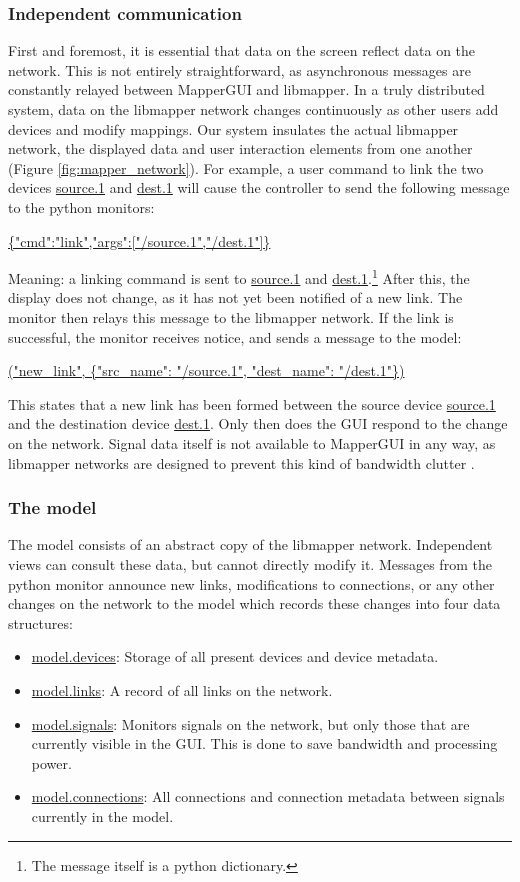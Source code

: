 		\subsubsection{Independent communication}

First and foremost, it is essential that data on the screen reflect data on the network. This is not entirely straightforward, as asynchronous messages are constantly relayed between MapperGUI and libmapper. In a truly distributed system, data on the libmapper network changes continuously as other users add devices and modify mappings. Our system insulates the actual libmapper network, the displayed data and user interaction elements from one another (Figure \ref{fig:mapper_network}). For example, a user command to link the two devices \url{source.1} and \url{dest.1} will cause the controller to send the following message to the python monitors:

\url{ {"cmd":"link","args":["/source.1","/dest.1"]} }

Meaning: a linking command is sent to \url{source.1} and \url{dest.1}.\footnote{The message itself is a python dictionary.} After this, the display does not change, as it has not yet been notified of a new link. The monitor then relays this message to the libmapper network. If the link is successful, the monitor receives notice, and sends a message to the model:

\url{("new_link", {"src_name": "/source.1", "dest_name": "/dest.1"}) }

This states that a new link has been formed between the source device \url{source.1} and the destination device \url{dest.1}. Only then does the GUI respond to the change on the network. Signal data itself is not available to MapperGUI in any way, as libmapper networks are designed to prevent this kind of bandwidth clutter .

		\subsubsection{The model}

The model consists of an abstract copy of the libmapper network. Independent views can consult these data, but cannot directly modify it. Messages from the python monitor announce new links, modifications to connections, or any other changes on the network to the model which records these changes into four data structures:

\begin{itemize}
 	\item \url{model.devices}: Storage of all present devices and device metadata.
 	\item \url{model.links}: A record of all links on the network.
 	\item \url{model.signals}: Monitors signals on the network, but only those that are currently visible in the GUI. This is done to save bandwidth and processing power. 
 	\item \url{model.connections}: All connections and connection metadata between signals currently in the model.
 \end{itemize} 

